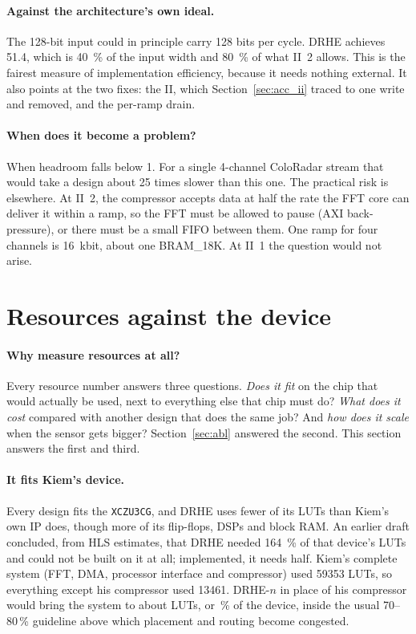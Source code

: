 \paragraph{Against the architecture's own ideal.} The 128-bit input could in
principle carry 128 bits per cycle. DRHE achieves 51.4, which is
\SI{40}{\percent} of the input width and \SI{80}{\percent} of what II~2 allows.
This is the fairest measure of implementation efficiency, because it needs
nothing external. It also points at the two fixes: the II, which
Section~\ref{sec:acc_ii} traced to one write and removed, and the per-ramp
drain.

\paragraph{When does it become a problem?} When headroom falls below 1. For a
single 4-channel ColoRadar stream that would take a design about 25 times
slower than this one. The practical risk is elsewhere. At II~2, the compressor
accepts data at half the rate the FFT core can deliver it within a ramp, so the
FFT must be allowed to pause (AXI back-pressure), or there must be a small
FIFO between them. One ramp for four channels is \SI{16}{\kilo bit}, about one
BRAM\_18K. At II~1 the question would not arise.


\section{Resources against the device}
\label{sec:resinterp}

\paragraph{Why measure resources at all?} Every resource number answers three
questions. \emph{Does it fit} on the chip that would actually be used, next to
everything else that chip must do? \emph{What does it cost} compared with
another design that does the same job? And \emph{how does it scale} when the
sensor gets bigger? Section~\ref{sec:abl} answered the second. This section
answers the first and third.



\paragraph{It fits Kiem's device.} Every design fits the \texttt{XCZU3CG}, and
DRHE uses fewer of its LUTs than Kiem's own IP does, though more of its
flip-flops, DSPs and block RAM. An earlier draft concluded, from
HLS estimates, that DRHE needed \SI{164}{\percent} of that device's LUTs and
could not be built on it at all; implemented, it needs half. Kiem's complete
system (FFT, DMA, processor interface and compressor) used \num{59353} LUTs, so
everything except his compressor used \num{13461}. DRHE-$n$ in place of his
compressor would bring the system to about  LUTs, or
\,\% of the device, inside the usual 70--80\,\% guideline
above which placement and routing become congested.

